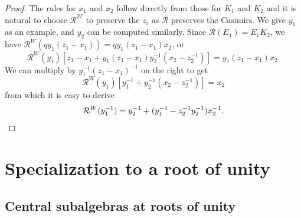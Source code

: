 \documentclass{sl2ams}
\numberwithin{equation}{section}
\newcommand{\W}{\mathcal{W}}
\newcommand{\R}{\mathcal{R}}
\begin{document}
\begin{proof}
  The rules for $x_1$ and $x_2$ follow directly from those for $K_1$ and $K_2$ and it is natural to choose \(\R^\W\) to preserve the \(z_i\) as \(\R\) preserves the Casimirs.
  We give $y_1$ as an example, and $y_2$ can be computed similarly.
  Since $\R(E_1) = E_1 K_2$, we have $\R^W(q y_1(z_1 - x_1)) = q y_1(z_1-x_1) x_2$, or
  \[
    \R^W(y_1)
    \left[
      z_1 - x_1 + y_1(z_1 - x_1) y_2^{-1} (x_2 - z_2^{-1})
    \right]
    =
    y_1(z_1 - x_1)x_2.
  \]
  We can multiply by  $y_1^{-1}(z_1 - x_1)^{-1}$ on the right to get
  \[
    \R^W(y_1) \left[ y_1^{-1} + y_2^{-1} (x_2 - z_2^{-1}) \right] = x_2
  \]
  from which it is easy to derive
  \[
    \R^W(y_1^{-1}) = y_2^{-1}+(y_1^{-1}-z_2^{-1}y_2^{-1})x_2^{-1}.\qedhere
  \]
\end{proof}

\section{Specialization to a root of unity}
\label{sec:root of unity}

\subsection{Central subalgebras at roots of unity}
\end{document}
